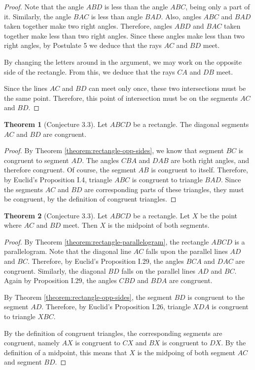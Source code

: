 \documentclass{tufte-handout}
\theoremstyle{definition}
\newtheorem{theorem}{Theorem}[section]
\begin{document}
\begin{proof}
Note that the angle $ABD$ is less than the angle $ABC$, being only a part of it. Similarly, the angle $BAC$ is less than angle $BAD$. Also, angles $ABC$ and $BAD$ taken together make two right angles. Therefore, angles $ABD$ and $BAC$ taken together make less than two right angles. Since these angles make less than two right angles, by Postulate 5 we deduce that the rays $AC$ and $BD$ meet.

By changing the letters around in the argument, we may work on the opposite side of the rectangle. From this, we deduce that the rays $CA$ and $DB$ meet.

Since the lines $AC$ and $BD$ can meet only once, these two intersections must be the same point. Therefore, this point of intersection must be on the segments $AC$ and $BD$.
\end{proof}

\clearpage

\begin{theorem}[Conjecture 3.3]
\label{theorem:rectangle-diags-cong}
Let $ABCD$ be a rectangle. The diagonal segments $AC$ and $BD$ are congruent.
\end{theorem}

\begin{proof}
By Theorem \ref{theorem:rectangle-opp-sides}, we know that segment $BC$ is congruent to segment $AD$. The angles $CBA$ and $DAB$ are both right angles, and therefore congruent. Of course, the segment $AB$ is congruent to itself. Therefore, by Euclid's Proposition I.4, triangle $ABC$ is congruent to triangle $BAD$. Since the segments $AC$ and $BD$ are corresponding parts of these triangles, they must be congruent, by the definition of congruent triangles.
\end{proof}


\begin{theorem}[Conjecture 3.3]
Let $ABCD$ be a rectangle. Let $X$ be the point where $AC$ and $BD$ meet. Then $X$ is the midpoint of both segments.
\end{theorem}

\begin{proof}
By Theorem \ref{theorem:rectangle-parallelogram}, the rectangle $ABCD$ is a parallelogram. Note that the diagonal line $AC$ falls upon the parallel lines $AD$ and $BC$. Therefore, by Euclid's Proposition I.29, the angles $BCA$ and $DAC$ are congruent. Similarly, the diagonal $BD$ falls on the parallel lines $AD$ and $BC$. Again by Proposition I.29, the angles $CBD$ and $BDA$ are congruent. 

By Theorem \ref{theorem:rectangle-opp-sides}, the segment $BD$ is congruent to the segment $AD$. Therefore, by Euclid's Proposition I.26, triangle $XDA$ is congruent to triangle $XBC$.

By the definition of congruent triangles, the corresponding segments are congruent, namely $AX$ is congruent to $CX$ and $BX$ is congruent to $DX$. By the definition of a midpoint, this means that $X$ is the midpoing of both segment $AC$ and segment $BD$.

\end{proof}
\end{document}
